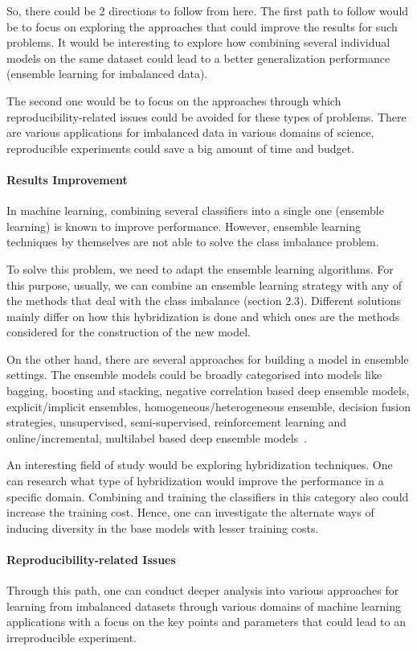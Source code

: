 So, there could be 2 directions to follow from here. The first path to follow would be to 
focus on exploring the approaches that could improve the results for such problems. 
It would be interesting to explore how combining several individual models on the same 
dataset could lead to a better generalization performance (ensemble learning for imbalanced data).

The second one would be to focus on the approaches through which reproducibility-related 
issues could be avoided for these types of problems. There are various applications for 
imbalanced data in various domains of science, reproducible experiments could save a big 
amount of time and budget. 

\paragraph{Results Improvement}
In machine learning, combining several classifiers into a single one (ensemble learning) 
is known to improve performance. However, ensemble learning techniques by themselves are 
not able to solve the class imbalance problem. 

To solve this problem, we need to adapt the ensemble learning algorithms. For this purpose, 
usually, we can combine an ensemble learning strategy with any of the methods that deal 
with the class imbalance (section 2.3). Different solutions mainly differ on how this 
hybridization is done and which ones are the methods considered for the construction of 
the new model.

On the other hand, there are several approaches for building a model in ensemble settings. 
The ensemble models could be broadly categorised into models like bagging, boosting and 
stacking, negative correlation based deep ensemble models, explicit/implicit ensembles, 
homogeneous/heterogeneous ensemble, decision fusion strategies, unsupervised, semi-supervised, 
reinforcement learning and online/incremental, multilabel based deep 
ensemble models~\cite{ganaie2021ensemble}.

An interesting field of study would be exploring hybridization techniques. One can research 
what type of hybridization would improve the performance in a specific domain. 
Combining and training the classifiers in this category also could increase the 
training cost. Hence, one can investigate the alternate ways of inducing diversity 
in the base models with lesser training costs.

\paragraph{Reproducibility-related Issues}
Through this path, one can conduct deeper analysis into various approaches for learning 
from imbalanced datasets through various domains of machine learning applications with a 
focus on the key points and parameters that could lead to an irreproducible experiment.


